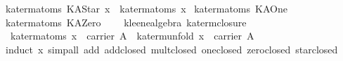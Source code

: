 \begin{isabellebody}
{}\ {}ka{}term{}atoms\ {}KAStar\ x{}\ {}\ ka{}term{}atoms\ x{}\isanewline
{}\ {}ka{}term{}atoms\ KAOne\ {}\ {}{}{}\isanewline
{}\ {}ka{}term{}atoms\ KAZero\ {}\ {}{}{}\isanewline
\isanewline
{}\isamarkupfalse%
\ {}\ kleene{}algebra{}\ ka{}term{}closure{}\isanewline
\ \ {}ka{}term{}atoms\ x\ {}\ carrier\ A\ {}\ ka{}term{}unfold\ x\ {}\ carrier\ A{}\isanewline
%
\isadelimproof
\ \ %
\endisadelimproof
%
\isatagproof
{}\isamarkupfalse%
\ {}induct\ x{}\ simp{}all\ add{}\ add{}closed\ mult{}closed\ one{}closed\ zero{}closed\ star{}closed{}%
\endisatagproof
{\isafoldproof}%
%
\isadelimproof
\isanewline
%
\endisadelimproof
%
\isadelimML
\isanewline
%
\endisadelimML
%
\isatagML
{}\isamarkupfalse%
\ {}\isanewline

\end{isabellebody}
